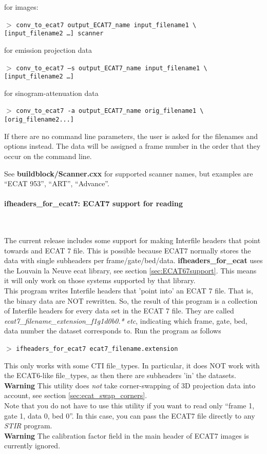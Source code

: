 \documentclass{article}
\newcommand{\tab}{\hspace{5mm}}
\newcommand{\subsubsubsection}[1]{\paragraph{#1}\mbox{} \\}
\newcommand{\cmdline}[1]{\par \noindent $>$ \texttt{#1}\par}
\begin{document}
{for images:
\cmdline{conv\_to\_ecat7 output\_ECAT7\_name input\_filename1 {\textbackslash}\\
{[}input\_filename2 \dots ] scanner}


for emission projection data
\cmdline{conv\_to\_ecat7 --s output\_ECAT7\_name input\_filename1 {\textbackslash}\\
{[}input\_filename2 \dots ]\tab  }


for sinogram-attenuation data
\cmdline{conv\_to\_ecat7 -a output\_ECAT7\_name orig\_filename1 {\textbackslash}\\
{[}orig\_filename2...]}


If there are no command line parameters, the user is asked for 
the filenames and options instead. The data will be assigned 
a frame number in the order that they occur on the command line.


See \textbf{buildblock/Scanner.cxx} for supported scanner names, but 
examples are ``ECAT 953'', ``ART'', ``Advance''. 


{ \subsubsubsection{ifheaders\_for\_ecat7: ECAT7 support for reading}
}
The current release includes some support for making Interfile 
headers that point towards and ECAT 7 file. This is possible 
because ECAT7 normally stores the data with single subheaders 
per frame/gate/bed/data. \textbf{ifheaders\_for\_ecat} uses the Louvain 
la Neuve ecat library, see section \ref{sec:ECAT67support}. 
This means it will only work on those systems 
supported by that library. \\
This program writes Interfile headers that 'point into' an ECAT 
7 file. That is, the binary data are NOT rewritten. So, the result 
of this program is a collection of Interfile headers for every 
data set in the ECAT 7 file. They are called \textit{ecat7\_filename\_extension\_f1g1d0b0.* 
etc}, indicating which frame, gate, bed, data number the dataset 
corresponds to. Run the program as follows
\cmdline{ifheaders\_for\_ecat7 ecat7\_filename.extension}


This only works with some CTI file\_types. In particular, it 
does NOT work with the ECAT6-like file\_types, as then there 
are subheaders 'in' the datasets.\\
\textbf{Warning} This utility does \textit{not} take corner-swapping of 
3D projection data into account, see section \ref{sec:ecat_swap_corners}.\\
Note that you do not have to use this utility if you want to 
read only ``frame 1, gate 1, data 0, bed 0''. In this case, you 
can pass the ECAT7 file directly to any \textit{STIR} program.
\\
\textbf{Warning} The calibration factor field in the main header of ECAT7 images
is currently ignored.

}
\end{document}
